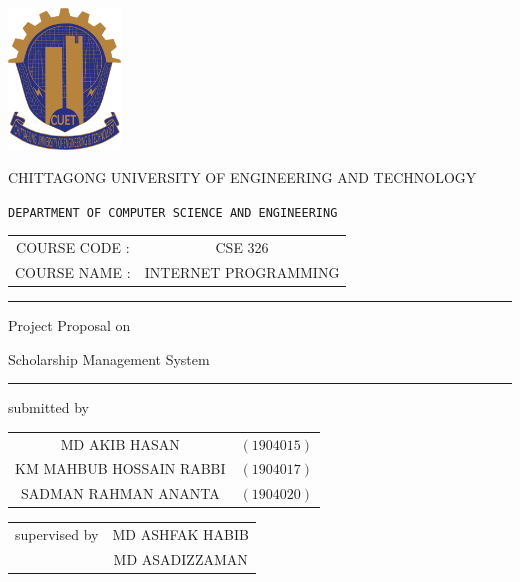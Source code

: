 \documentclass[a4paper,11pt]{report}
\begin{document}
\begin{titlepage}
	\scshape
	\centering

	\includegraphics[width=3cm, keepaspectratio]{cuet.png} \par \vspace{0.1cm}
	\begin{Large}
		CHITTAGONG UNIVERSITY OF ENGINEERING AND TECHNOLOGY
	\end{Large}
	\par
	\texttt{DEPARTMENT OF COMPUTER SCIENCE AND ENGINEERING}
	\vspace{2cm}

	\begin{tabular}{cc}
		COURSE CODE : & CSE 326              \\
		COURSE NAME : & INTERNET PROGRAMMING
	\end{tabular}
	\vspace{1cm}

	\raisebox{-\baselineskip}{\rule{\textwidth}{1px}}
	\rule{\textwidth}{1px}

	\vspace{0.2cm}
	{\Large{{Project Proposal on}}}\par \vspace{0.5cm}
	\huge{{Scholarship Management System }}
	\rule{\textwidth}{2px}


	\vspace{2cm}
	\normalsize

	\parbox[l]{8cm}{
		\begin{center}
			submitted by
		\end{center}

		\begin{tabular}{cl}
			MD AKIB HASAN           & $(1904015)$ \\
			KM MAHBUB HOSSAIN RABBI & $(1904017)$ \\
			SADMAN RAHMAN ANANTA    & $(1904020)$ \\
		\end{tabular}
	}
	\parbox[r]{8cm}{
		\begin{tabular}{cc}
			supervised by & MD ASHFAK HABIB \\
			              & MD ASADIZZAMAN
		\end{tabular}
	}


\end{titlepage}
\end{document}
